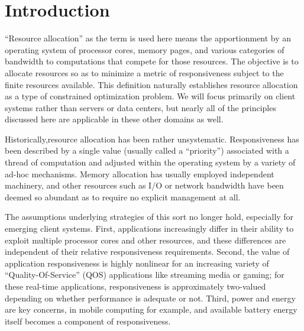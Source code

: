 \section{Introduction}

``Resource allocation'' as the term is used here means the apportionment by an operating system of processor cores, memory pages, and various categories of  bandwidth to computations that compete for those resources.  The objective is to allocate resources so as to minimize a metric of responsiveness subject to the finite resources available.  This definition naturally establishes resource allocation as a type of constrained optimization problem.  We will focus primarily on client systems rather than servers or data centers, but nearly all of the principles discussed here are applicable in these other domains as well.

Historically,resource allocation has been rather unsystematic.  Responsiveness has been described by a single value (usually called a “priority”) associated with a thread of computation and adjusted within the operating system by a variety of ad-hoc mechanisms.  Memory allocation has usually employed independent machinery, and other resources such as I/O or network bandwidth have been deemed so abundant as to require no explicit management at all.

The assumptions underlying strategies of this sort no longer hold, especially for emerging client systems.  First, applications increasingly differ in their ability to exploit multiple processor cores and other resources, and these differences are independent of their relative responsiveness requirements.  Second, the value of application responsiveness is highly nonlinear for an increasing variety of “Quality-Of-Service” (QOS) applications like streaming media or gaming; for these real-time applications, responsiveness is approximately two-valued depending on whether performance is adequate or not.  Third, power and energy are key concerns, in mobile computing for example, and available battery energy itself becomes a component of responsiveness.
